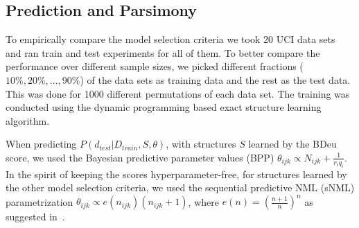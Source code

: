 \subsection{Prediction and Parsimony}

To empirically compare the model selection criteria we took 20 UCI
data sets~\cite{Lichman:2013} and ran train and test experiments for
all of them. To better compare the performance over different sample
sizes, we picked different fractions ($10\%, 20\%, \ldots, 90\%$) of
the data sets as training data and the rest as the test data.
This was done for 1000 different permutations of each data set.
The training was conducted using the dynamic
programming based exact structure learning algorithm.

When predicting $P(d_{test}|D_{train},S,\theta)$,
with structures $S$ learned by the BDeu score, we used the
Bayesian predictive parameter values (BPP) $\theta_{ijk} \propto
N_{ijk}+\frac{1}{r_iq_i}$.  In the spirit of keeping the scores
hyperparameter-free, for structures learned by the other model
selection criteria, we used the sequential predictive NML (sNML)
parametrization $\theta_{ijk}\propto e(n_{ijk})(n_{ijk}+1)$, where
$e(n)=(\frac{n+1}{n})^n$ as suggested in~\cite{Riss07b}.

